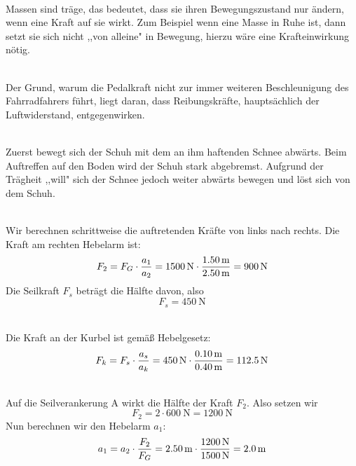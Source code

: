 \documentclass[a4paper]{article}
\begin{document}
\vspace{0.5 cm}

\\
Massen sind träge, das bedeutet, dass sie ihren Bewegungszustand nur ändern, wenn eine Kraft auf sie wirkt. Zum Beispiel wenn eine Masse in Ruhe ist, dann setzt sie sich nicht ,,von alleine" in Bewegung, hierzu wäre eine Krafteinwirkung nötig.    
\vspace{0.5 cm}

\\
Der Grund, warum die Pedalkraft nicht zur immer weiteren Beschleunigung des Fahrradfahrers führt, liegt daran, dass Reibungskräfte, hauptsächlich der Luftwiderstand, entgegenwirken.
\vspace{0.5 cm}

\\
Zuerst bewegt sich der Schuh mit dem an ihm haftenden Schnee abwärts. Beim Auftreffen auf den Boden wird der Schuh stark abgebremst. Aufgrund der Trägheit ,,will" sich der Schnee jedoch weiter abwärts bewegen und löst sich von dem Schuh.
\vspace{0.5 cm}

\\
Wir berechnen schrittweise die auftretenden Kräfte von links nach rechts. Die Kraft am rechten Hebelarm ist: 
$$F_2=F_G \cdot {a_1 \over a_2}=\SI{1500}{\newton} \cdot {\SI{1,50}{\meter} \over \SI{2,50}{\meter} }=\SI{900}{\newton}$$
Die Seilkraft $F_s$ beträgt die Hälfte davon, also $$F_s=\SI{450}{\newton}$$
\vspace{0.5 cm}

\\
Die Kraft an der Kurbel ist gemäß Hebelgesetz:
$$F_k = F_s \cdot {a_s \over a_k}=\SI{450}{\newton} \cdot {\SI{0,10}{\meter} \over \SI{0,40}{\meter} }=\SI{112,5}{\newton}$$
\vspace{0.5 cm}

\\
Auf die Seilverankerung A wirkt die Hälfte der Kraft $F_2$. Also setzen wir  
$$F_2=2\cdot \SI{600}{\newton}= \SI{1200}{\newton}$$
Nun berechnen wir den Hebelarm $a_1$:
$$a_1 = a_2 \cdot {F_2 \over F_G}=\SI{2,50}{\meter}\cdot {\SI{1200}{\newton}\over \SI{1500}{\newton}}=\SI{2,0}{\meter}$$
\vspace{0.5 cm}
\end{document}
